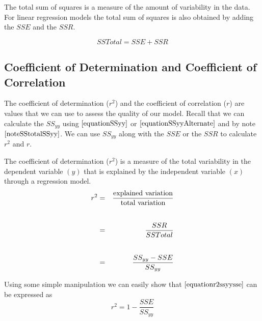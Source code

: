 \noindent
The total sum of squares is a measure of the amount
of variability in the data.
For linear regression models the total sum of squares
is also obtained by adding the
$SSE$ and the $SSR$.

\begin{skeleton}
	\begin{equation}
	SSTotal = SSE + SSR
	\end{equation}
\end{skeleton}















\subsection{Coefficient of Determination and Coefficient of Correlation}
\label{sectionRandRsquare}

The coefficient of determination ($r^{2}$) and 
the coefficient of correlation ($r$) are values that we can 
use to assess the quality of our model.
Recall that we can calculate the $SS_{yy}$ using 
$\ref{equationSSyy}$
or $\ref{equationSSyyAlternate}$
and by note $\ref{noteSStotalSSyy}$.
We can use $SS_{yy}$ along with the $SSE$ or the $SSR$ to calculate
$r^{2}$ and $r$.


\begin{definition}
The coefficient of determination ($r^{2}$) is a measure of the total variability in the dependent 
variable $(y)$ that is explained by the independent variable $(x)$ through a regression model.	
		\begin{eqnarray}
		r^{2}		& = &	\frac{ \text{explained variation} }{ \text{total variation} }	\\
			\hfill \nonumber\\[0.5em]
				& = &	\frac{ SSR}{SSTotal}	\\
			\hfill	\nonumber\\[0.5em]
				& = &	\frac{SS_{yy} - SSE}{SS_{yy}} \label{equationr2ssyysse}
		\end{eqnarray}
\end{definition}

\begin{nt}
Using some simple manipulation we can easily show that $\ref{equationr2ssyysse}$
can be expressed as
	\begin{equation}
	r^{2} = 1 - \frac{SSE}{SS_{yy}} 
	\end{equation}
\end{nt}

